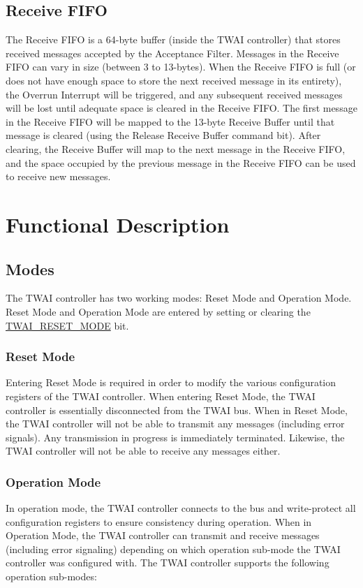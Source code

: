\documentclass[main\_\_EN.tex]{subfiles}
\begin{document}
\subsection{Receive FIFO}
The Receive FIFO is a 64-byte buffer (inside the TWAI controller) that stores received messages accepted by the Acceptance Filter. Messages in the Receive FIFO can vary in size (between 3 to 13-bytes). When the Receive FIFO is full (or does not have enough space to store the next received message in its entirety), the Overrun Interrupt will be triggered, and any subsequent received messages will be lost until adequate space is cleared in the Receive FIFO. The first message in the Receive FIFO will be mapped to the 13-byte Receive Buffer until that message is cleared (using the Release Receive Buffer command bit). After clearing, the Receive Buffer will map to the next message in the Receive FIFO, and the space occupied by the previous message in the Receive FIFO can be used to receive new messages.


\section{Functional Description}

\subsection{Modes}
\label{sec:twai-modes}
The \chipname{} TWAI controller has two working modes: Reset Mode and Operation Mode. Reset Mode and Operation Mode are entered by setting or clearing the \hyperref[fielddesc:TWAIRESETMODE]{TWAI\_RESET\_MODE} bit.

\subsubsection{Reset Mode}
Entering Reset Mode is required in order to modify the various configuration registers of the TWAI controller. When entering Reset Mode, the TWAI controller is essentially disconnected from the TWAI bus. When in Reset Mode, the TWAI controller will not be able to transmit any messages (including error signals). Any transmission in progress is immediately terminated. Likewise, the TWAI controller will not be able to receive any messages either.

\subsubsection{Operation Mode}
In operation mode, the TWAI controller connects to the bus and write-protect all configuration registers to ensure consistency during operation. When in Operation Mode, the TWAI controller can transmit and receive messages (including error signaling) depending on which operation sub-mode the TWAI controller was configured with. The TWAI controller supports the following operation sub-modes:
\end{document}
